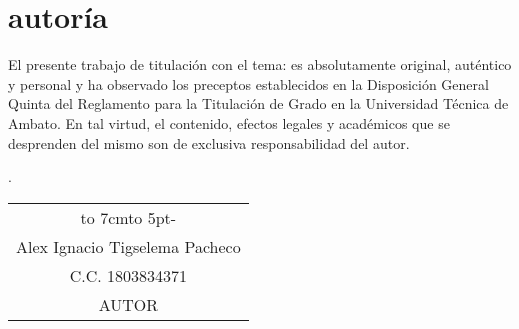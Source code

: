 \chapter*{autoría}
El presente trabajo de titulaci\'on con el tema: {\MakeUppercase\tema} es absolutamente original, auténtico y personal y ha observado
los preceptos establecidos en la Disposición General Quinta del Reglamento para la
Titulación de Grado en la Universidad Técnica de Ambato. En tal virtud, el contenido,
efectos legales y académicos que se desprenden del mismo son de exclusiva
responsabilidad del autor.\begin{flushright}
	\lugarFechaPrelims.
\end{flushright}

\vspace*{5cm}
\begin{center}
	\begin{tabular}{c}
		\hbox to 7cm{\leaders\hbox to 5pt{\hss - \hss}\hfil} \\
		Alex Ignacio Tigselema Pacheco                      \\
		C.C. 1803834371                                      \\
		AUTOR
	\end{tabular}
\end{center}

